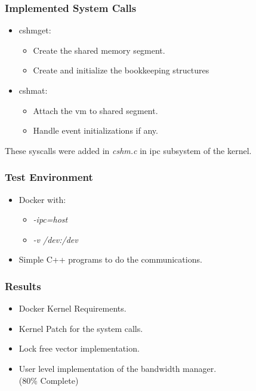 \documentclass{beamer}
\begin{document}
\begin{frame}
    \frametitle{Implemented System Calls}
    \begin{itemize}
        \item cshmget:
            \begin{itemize}
                \item Create the shared memory segment.
                \item Create and initialize the bookkeeping structures
            \end{itemize}
        \item cshmat:
            \begin{itemize}
                \item Attach the vm to shared segment.
                \item Handle event initializations if any.
            \end{itemize}
    \end{itemize}
    These syscalls were added in \textit{cshm.c} in ipc subsystem of the
    kernel.
\end{frame}

\begin{frame}
    \frametitle{Test Environment}
    \begin{itemize}
        \item Docker with:
            \begin{itemize}
                \item \textit{-ipc=host}
                \item \textit{-v /dev:/dev}
            \end{itemize}
        \item Simple C++ programs to do the communications.
    \end{itemize}
\end{frame}

\begin{frame}
    \frametitle{Results}
    \begin{itemize}
        \item Docker Kernel Requirements.
        \item Kernel Patch for the system calls.
        \item Lock free vector implementation.
        \item User level implementation of the bandwidth manager. \\
            (80\% Complete)
    \end{itemize}
\end{frame}
\end{document}
